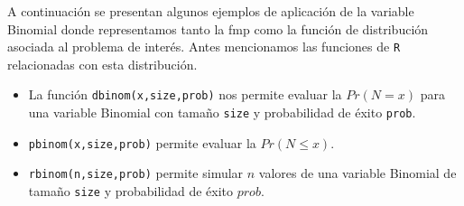 \documentclass[
]{book}
\providecommand{\tightlist}{%
  \setlength{\itemsep}{0pt}\setlength{\parskip}{0pt}}
\newenvironment{whitebox}{
  \definecolor{shadecolor}{rgb}{255, 255, 255}  
  \color{black}
  \begin{shaded}}
 {\end{shaded}}
\theoremstyle{definition}
\theoremstyle{definition}
\theoremstyle{definition}
\theoremstyle{definition}
\theoremstyle{remark}
\begin{document}
A continuación se presentan algunos ejemplos de aplicación de la variable Binomial donde representamos tanto la fmp como la función de distribución asociada al problema de interés. Antes mencionamos las funciones de \texttt{R} relacionadas con esta distribución.

\begin{whitebox}

\begin{itemize}
\tightlist
\item
  La función \texttt{dbinom(x,size,prob)} nos permite evaluar la \(Pr(N=x)\) para una variable Binomial con tamaño \texttt{size} y probabilidad de éxito \texttt{prob}.
\item
  \texttt{pbinom(x,size,prob)} permite evaluar la \(Pr(N \leq x)\).
\item
  \texttt{rbinom(n,size,prob)} permite simular \(n\) valores de una variable Binomial de tamaño \texttt{size} y probabilidad de éxito \(prob\).
\end{itemize}

\end{whitebox}
\end{document}
